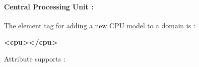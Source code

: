\documentclass[
  14pt,
  english,
  a4paper,
]{scrreprt}
\newenvironment{Shaded}{}{}
\newcommand{\KeywordTok}[1]{\textcolor[rgb]{0.00,0.44,0.13}{\textbf{#1}}}
\begin{document}
\hypertarget{central-processing-unit-2}{%
\paragraph*{Central Processing Unit :}\label{central-processing-unit-2}}

The element tag for adding a new CPU model to a domain is :

\begin{Shaded}
\begin{Highlighting}[]
\KeywordTok{\textless{}cpu\textgreater{}\textless{}/cpu\textgreater{}}
\end{Highlighting}
\end{Shaded}

Attribute supports :
\end{document}
